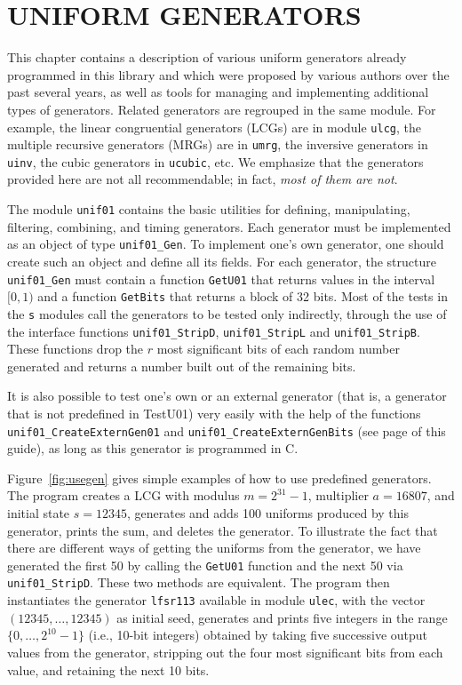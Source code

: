 \chapter{UNIFORM GENERATORS}

This chapter contains a description of various uniform generators
already programmed in this library and which were proposed by various 
authors over the past several years, as well as tools for managing
and implementing additional types of generators.
Related generators are regrouped in the same module.
For example, the linear congruential generators (LCGs) are in module
{\tt ulcg}, the multiple recursive generators (MRGs) are in {\tt umrg}, 
the inversive generators in {\tt uinv},
the cubic generators in {\tt ucubic}, etc.
We emphasize that the generators provided here are not all recommendable;
in fact, {\em most of them are not}.

The module {\tt unif01} contains the basic utilities for defining,
manipulating, filtering, combining, and timing generators.  
Each generator must be implemented as an 
object of type {\tt unif01\_Gen}.  To implement one's own generator,
one should create such an object and define all its fields.
For each generator, the structure {\tt unif01\_Gen} must contain a 
function {\tt GetU01} that returns values in the interval $[0,1)$
and a function {\tt GetBits} that returns a block of 32 bits.  
Most of the tests in the {\tt s} modules call the generators
to be tested only indirectly, through the use of the interface 
functions {\tt unif01\_StripD}, {\tt unif01\_StripL} and  
{\tt unif01\_StripB}.
These functions drop the $r$ most significant bits of each random number 
generated and returns a number built out of the remaining bits.

It is also possible to test one's own or an external generator
(that is, a generator that is not predefined in TestU01) very easily with
the help of the functions {\tt unif01\_CreateExternGen01} and
{\tt unif01\_CreateExternGenBits} (see page \pageref{externgen}
of this guide), as long as this generator is programmed in C.

Figure~\ref{fig:usegen} gives simple examples of how to use predefined
generators.  The program creates a LCG with modulus $m = 2^{31}-1$,
multiplier $a = 16807$, and initial state $s = 12345$,
generates and adds 100 uniforms produced by this generator,
prints the sum, and deletes the generator.
To illustrate the fact that there are different ways of getting the
uniforms from the generator, we have generated the first 50 by calling
the {\tt GetU01} function and the next 50 via {\tt unif01\_StripD}.
These two methods are equivalent.
The program then instantiates the generator {\tt lfsr113} available in 
module {\tt ulec}, with the vector $(12345, \ldots, 12345)$ as initial seed,
generates and prints five integers in the range $\{0,\dots,2^{10}-1\}$
(i.e., 10-bit integers) obtained by taking five successive output values
from the generator, stripping out the four most significant bits from 
each value, and retaining the next 10 bits.

